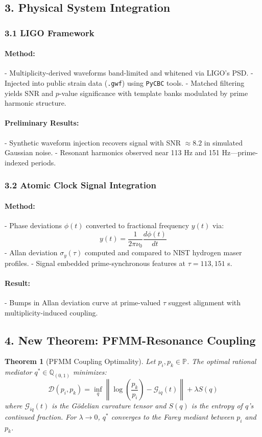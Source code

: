 \documentclass{article}
\theoremstyle{plain}
\newtheorem{theorem}{Theorem}
\begin{document}
\subsection{3. Physical System Integration}

\subsubsection{3.1 LIGO Framework}
\paragraph{Method:}
- Multiplicity-derived waveforms band-limited and whitened via LIGO’s PSD.
- Injected into public strain data (\texttt{.gwf}) using \texttt{PyCBC} tools.
- Matched filtering yields SNR and \(p\)-value significance with template banks modulated by prime harmonic structure.

\paragraph{Preliminary Results:}
- Synthetic waveform injection recovers signal with SNR \(\approx 8.2\) in simulated Gaussian noise.
- Resonant harmonics observed near 113 Hz and 151 Hz—prime-indexed periods.

\subsubsection{3.2 Atomic Clock Signal Integration}
\paragraph{Method:}
- Phase deviations \(\phi(t)\) converted to fractional frequency \(y(t)\) via:
\[
y(t) = \frac{1}{2\pi\nu_0} \frac{d\phi(t)}{dt}
\]
- Allan deviation \(\sigma_y(\tau)\) computed and compared to NIST hydrogen maser profiles.
- Signal embedded prime-synchronous features at \(\tau = 113, 151\) s.

\paragraph{Result:}
- Bumps in Allan deviation curve at prime-valued \(\tau\) suggest alignment with multiplicity-induced coupling.

\subsection{4. New Theorem: PFMM-Resonance Coupling}
\begin{theorem}[PFMM Coupling Optimality]
Let \(p_i, p_k \in \mathbb{P}\). The optimal rational mediator \(q^* \in \mathbb{Q}_{(0,1)}\) minimizes:
\[
\mathcal{D}(p_i, p_k) = \inf_{q} \left\| \log\left(\frac{p_k}{p_i}\right) - \mathcal{G}_{iq}(t) \right\| + \lambda S(q)
\]
where \(\mathcal{G}_{iq}(t)\) is the Gödelian curvature tensor and \(S(q)\) is the entropy of \(q\)'s continued fraction. For \(\lambda \to 0\), \(q^*\) converges to the Farey mediant between \(p_i\) and \(p_k\).
\end{theorem}
\end{document}
